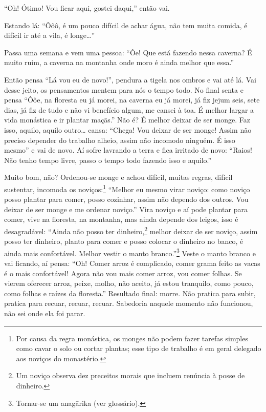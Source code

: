 “Oh! Ótimo! Vou ficar aqui, gostei daqui,” então vai. 

Estando lá: “Ôôô, é um pouco difícil de achar água, não tem muita
comida, é difícil ir até a vila, é longe\ldots{}”

Passa uma semana e vem uma pessoa: “Ôe! Que está fazendo nessa
caverna? É muito ruim, a caverna na montanha onde moro é ainda melhor
que essa.”

Então pensa “Lá vou eu de novo!”, pendura a tigela nos ombros e vai
até lá. Vai desse jeito, os pensamentos mentem para nós o tempo todo.
No final senta e pensa “Ôôe, na floresta eu já morei, na caverna eu já
morei, já fiz jejum seis, sete dias, já fiz de tudo e não vi benefício
algum, me cansei à toa. É melhor largar a vida monástica e ir plantar
maçãs.” Não é? É melhor deixar de ser monge. Faz isso, aquilo, aquilo
outro\ldots{} cansa: “Chega! Vou deixar de ser monge! Assim não preciso
depender do trabalho alheio, assim não incomodo ninguém. É isso mesmo”
e vai de novo. Aí sofre lavrando a terra e fica irritado de novo:
“Raios! Não tenho tempo livre, passo o tempo todo fazendo isso e
aquilo.” 

Muito bom, não? Ordenou-se monge e achou difícil, muitas regras,
difícil sustentar, incomoda os noviços:\footnote{Por causa da regra
monástica, os monges não podem fazer tarefas simples como cavar o solo
ou cortar plantas; esse tipo de trabalho é em geral delegado aos
noviços do monastério.} “Melhor eu mesmo virar noviço: como noviço
posso plantar para comer, posso cozinhar, assim não dependo dos outros.
Vou deixar de ser monge e me ordenar noviço.” Vira noviço e aí pode
plantar para comer, vive na floresta, na montanha, mas ainda depende
dos leigos, isso é desagradável: “Ainda não posso ter
dinheiro,\footnote{Um noviço observa dez preceitos morais que incluem
renúncia à posse de dinheiro.} melhor deixar de ser noviço, assim
posso ter dinheiro, planto para comer e posso colocar o dinheiro no
banco, é ainda mais confortável. Melhor vestir o manto
branco.”\footnote{Tornar-se um anagārika (ver glossário).} Veste o
manto branco e vai ficando, aí pensa: “Oh! Comer arroz é complicado,
comer grama feito as vacas é o mais confortável! Agora não vou mais
comer arroz, vou comer folhas. Se vierem oferecer arroz, peixe, molho,
não aceito, já estou tranquilo, como pouco, como folhas e raízes da
floresta.” Resultado final: morre. Não pratica para subir, pratica para
recuar, recuar, recuar. Sabedoria naquele momento não funcionou, não
sei onde ela foi parar. 

